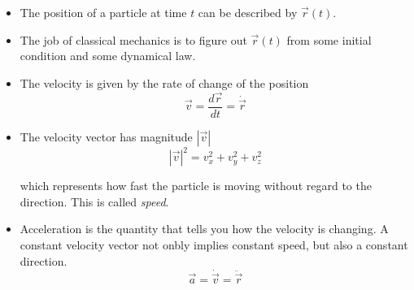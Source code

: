 \documentclass[../main.tex]{subfiles}
\begin{document}
\begin{itemize}
    \item The position of a particle at time $t$ can be described by
        $\vec{r}(t)$.

    \item The job of classical mechanics is to figure out $\vec{r}(t)$ from
        some initial condition and some dynamical law.

    \item The velocity is given by the rate of change of the position
        \begin{equation}
            \vec{v} = \frac{d\vec{r}}{dt} = \dot{\vec{r}}
        \end{equation}

    \item The velocity vector has magnitude $|\vec{v}|$
        \begin{equation}
            |\vec{v}|^2 = v_x^2 + v_y^2 + v_z^2
        \end{equation}

        which represents how fast the particle is moving without regard to the
        direction. This is called \textit{speed}.  

    \item Acceleration is the quantity that tells you how the velocity is
        changing. A constant velocity vector not onbly implies constant speed,
        but also a constant direction.
        \begin{equation}
            \vec{a} = \dot{\vec{v}} = \ddot{\vec{r}}
        \end{equation}

\end{itemize}
\end{document}
